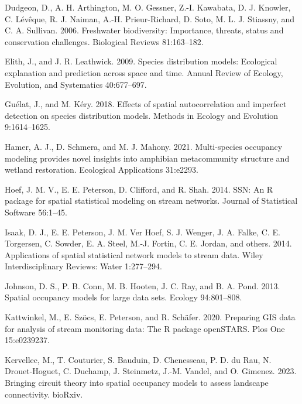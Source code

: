 \documentclass[
  11pt,
  a4paper,
]{article}
\newlength{\cslhangindent}
\newenvironment{CSLReferences}[2] %
 {\begin{list}{}{%
  \setlength{\itemindent}{0pt}
  \setlength{\leftmargin}{0pt}
  \setlength{\parsep}{0pt}
  \ifodd #1
   \setlength{\leftmargin}{\cslhangindent}
   \setlength{\itemindent}{-1\cslhangindent}
  \fi
  \setlength{\itemsep}{#2\baselineskip}}}
 {\end{list}}
\begin{document}
\begin{CSLReferences}{1}{0}
Dudgeon, D., A. H. Arthington, M. O. Gessner, Z.-I. Kawabata, D. J. Knowler, C. Lévêque, R. J. Naiman, A.-H. Prieur-Richard, D. Soto, M. L. J. Stiassny, and C. A. Sullivan. 2006. Freshwater biodiversity: Importance, threats, status and conservation challenges. Biological Reviews 81:163--182.

Elith, J., and J. R. Leathwick. 2009. Species distribution models: Ecological explanation and prediction across space and time. Annual Review of Ecology, Evolution, and Systematics 40:677--697.

Guélat, J., and M. Kéry. 2018. Effects of spatial autocorrelation and imperfect detection on species distribution models. Methods in Ecology and Evolution 9:1614--1625.

Hamer, A. J., D. Schmera, and M. J. Mahony. 2021. Multi-species occupancy modeling provides novel insights into amphibian metacommunity structure and wetland restoration. Ecological Applications 31:e2293.

Hoef, J. M. V., E. E. Peterson, D. Clifford, and R. Shah. 2014. {SSN}: An {R} package for spatial statistical modeling on stream networks. Journal of Statistical Software 56:1--45.

Isaak, D. J., E. E. Peterson, J. M. Ver Hoef, S. J. Wenger, J. A. Falke, C. E. Torgersen, C. Sowder, E. A. Steel, M.-J. Fortin, C. E. Jordan, and others. 2014. Applications of spatial statistical network models to stream data. Wiley Interdisciplinary Reviews: Water 1:277--294.

Johnson, D. S., P. B. Conn, M. B. Hooten, J. C. Ray, and B. A. Pond. 2013. Spatial occupancy models for large data sets. Ecology 94:801--808.

Kattwinkel, M., E. Szöcs, E. Peterson, and R. Schäfer. 2020. Preparing GIS data for analysis of stream monitoring data: The {R} package openSTARS. Plos One 15:e0239237.

Kervellec, M., T. Couturier, S. Bauduin, D. Chenesseau, P. D. du Rau, N. Drouet-Hoguet, C. Duchamp, J. Steinmetz, J.-M. Vandel, and O. Gimenez. 2023. Bringing circuit theory into spatial occupancy models to assess landscape connectivity. bioRxiv.


\end{CSLReferences}
\end{document}
